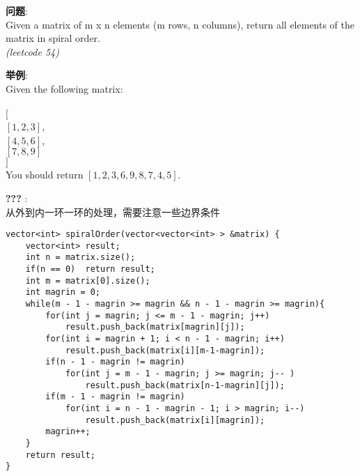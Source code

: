     
\begin{description}
    \item{\textbf{问题}}:\\
Given a matrix of m x n elements (m rows, n columns), return all elements of the matrix in spiral order.\\
\textit{(leetcode 54)}
    \item{\textbf{举例}}:\\
Given the following matrix:\\
\\
$[$ \\
 $[ 1, 2, 3 ]$, \\
 $[ 4, 5, 6 ]$, \\
 $[ 7, 8, 9 ]$ \\
$]$ \\
You should return $[1,2,3,6,9,8,7,4,5]$.
    \item{\textbf{???}} : 
    \\从外到内一环一环的处理，需要注意一些边界条件
    \begin{lstlisting}
vector<int> spiralOrder(vector<vector<int> > &matrix) {
	vector<int> result;
	int n = matrix.size();
	if(n == 0)	return result;
	int m = matrix[0].size();
	int magrin = 0;
	while(m - 1 - magrin >= magrin && n - 1 - magrin >= magrin){
		for(int j = magrin; j <= m - 1 - magrin; j++)
			result.push_back(matrix[magrin][j]);
		for(int i = magrin + 1; i < n - 1 - magrin; i++)
			result.push_back(matrix[i][m-1-magrin]);
		if(n - 1 - magrin != magrin)
			for(int j = m - 1 - magrin; j >= magrin; j-- )
				result.push_back(matrix[n-1-magrin][j]);
		if(m - 1 - magrin != magrin)
			for(int i = n - 1 - magrin - 1; i > magrin; i--)
				result.push_back(matrix[i][magrin]);
		magrin++;
	}
	return result;
}
    \end{lstlisting}
\end{description}
